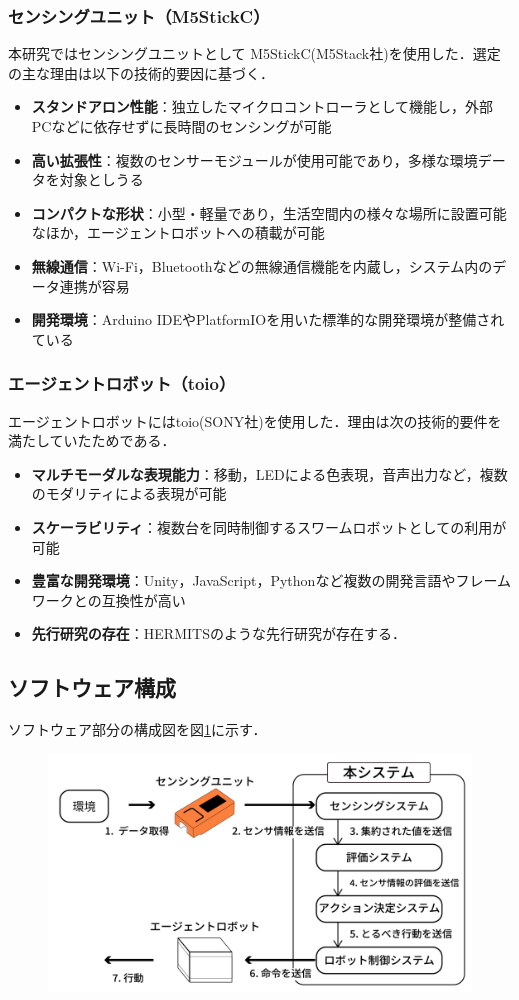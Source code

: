 \documentclass{cuxarticle}
\begin{document}
\subsubsection{センシングユニット（M5StickC）}
本研究ではセンシングユニットとして M5StickC(M5Stack社)\cite{--M5StickC}を使用した．選定の主な理由は以下の技術的要因に基づく．

\begin{itemize}
  \item \textbf{スタンドアロン性能}：独立したマイクロコントローラとして機能し，外部PCなどに依存せずに長時間のセンシングが可能
  \item \textbf{高い拡張性}：複数のセンサーモジュールが使用可能であり，多様な環境データを対象としうる
  \item \textbf{コンパクトな形状}：小型・軽量であり，生活空間内の様々な場所に設置可能なほか，エージェントロボットへの積載が可能
  \item \textbf{無線通信}：Wi-Fi，Bluetoothなどの無線通信機能を内蔵し，システム内のデータ連携が容易
  \item \textbf{開発環境}：Arduino IDEやPlatformIOを用いた標準的な開発環境が整備されている
\end{itemize}

\subsubsection{エージェントロボット（toio）}
エージェントロボットにはtoio(SONY社)\cite{--小さなキ}を使用した．理由は次の技術的要件を満たしていたためである．

\begin{itemize}
  \item \textbf{マルチモーダルな表現能力}：移動，LEDによる色表現，音声出力など，複数のモダリティによる表現が可能
  \item \textbf{スケーラビリティ}：複数台を同時制御するスワームロボットとしての利用が可能
  \item \textbf{豊富な開発環境}：Unity，JavaScript，Pythonなど複数の開発言語やフレームワークとの互換性が高い
  \item \textbf{先行研究の存在}：HERMITS\cite{--HERMITSProceedings33rdAnnual}のような先行研究が存在する．
\end{itemize}

\subsection{ソフトウェア構成}
ソフトウェア部分の構成図を図\ref{fig:software-architecture}に示す．
\begin{figure}[h]
  \centering
  \includegraphics[keepaspectratio, width=0.6\columnwidth]{resources/system_structure.png}
  \caption[short]{}
  \label{fig:software-architecture}
\end{figure}
\end{document}

